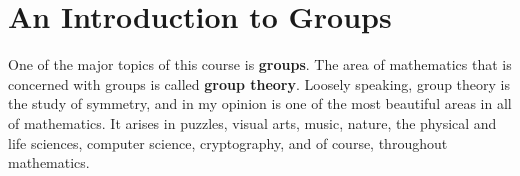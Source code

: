\chapter{An Introduction to Groups}
\label{chapter:intro_groups}
\thispagestyle{empty}


One of the major topics of this course is \textbf{groups}.  The area of mathematics that is concerned with groups is called \textbf{group theory}. Loosely speaking, group theory is the study of symmetry, and in my opinion is one of the most beautiful areas in all of mathematics. It arises in puzzles, visual arts, music, nature, the physical and life sciences, computer science, cryptography, and of course, throughout mathematics.


